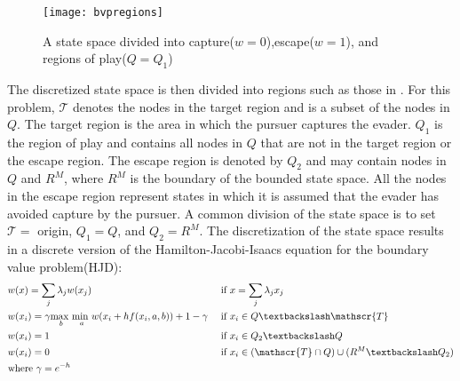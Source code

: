 \begin{figure}
\centering
\texttt{[image: bvpregions]}
\caption{A state space divided into capture($w=0$),escape($w=1$), and regions of play($Q=Q_1$) \cite{bardi2}}
\label{bvpregions}
\end{figure}
The discretized state space is then divided into regions such as those in . For this problem, $\mathscr{T}$ denotes the nodes in the target region and is a subset of the nodes in $Q$. The target region is the area in which the pursuer captures the evader. $Q_1$ is the region of play and contains all nodes in $Q$ that are not in the target region or the escape region. The escape region is denoted by $Q_2$ and may contain nodes in $Q$ and $R^M$, where $R^M$ is the boundary of the bounded state space. All the nodes in the escape region represent states in which it is assumed that the evader has avoided capture by the pursuer. A common division of the state space is to set $\mathscr{T}=$ origin, $Q_1 = Q$, and $Q_2 = R^M$. The discretization of the state space results in a discrete version of the Hamilton-Jacobi-Isaacs equation for the boundary value problem(HJD):
\begin{align}
  & w(x)  =  \sum_j\lambda_jw(x_j) && \textnormal{ if } x = \sum_j\lambda_jx_j \label{dbvp1} \\
  & w(x_i)  =  \gamma\underset{b}{\operatorname{max \textnormal{ } }}\underset{a}{\operatorname{min \textnormal{ }}} w(x_i +hf(x_i,a,b))+1-\gamma && \textnormal{ if } x_i \in Q\textbackslash \mathscr{T} \label{dbvp2} \\
  & w(x_i) = 1 && \textnormal{ if } x_i \in Q_2\textbackslash Q \label{dbvp3} \\
  & w(x_i) = 0 && \textnormal{ if } x_i \in (\mathscr{T} \cap Q) \cup (R^M \textbackslash Q_2) \label{dbvp4} \\
  & \textnormal{where } \gamma = e^{-h} \label{dbvp5}
\end{align}    


